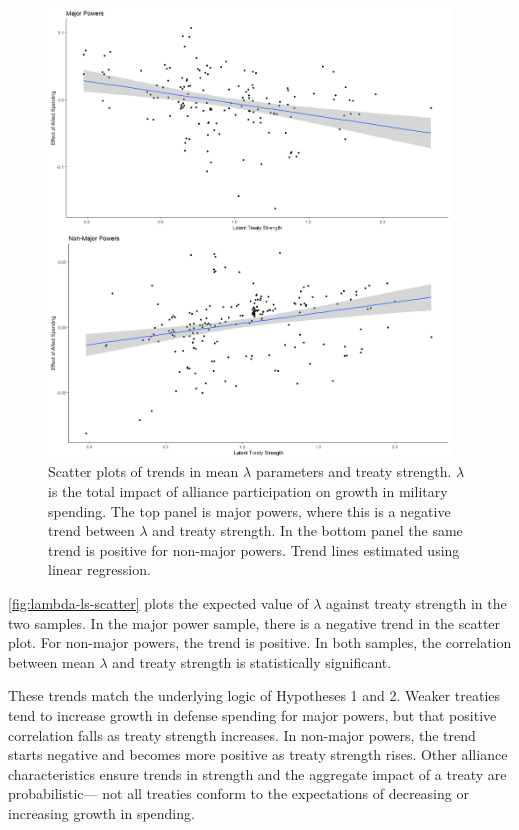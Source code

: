 \documentclass[12pt]{article}
\begin{document}
\begin{figure}[htbp]
	\centering
		\includegraphics[width=0.95\textwidth]{../figures/lambda-ls-scatter.png}
	\caption{Scatter plots of trends in mean $\lambda$ parameters and treaty strength. $\lambda$ is the total impact of alliance participation on growth in military spending. The top panel is major powers, where this is a negative trend between $\lambda$ and treaty strength. In the bottom panel the same trend is positive for non-major powers. Trend lines estimated using linear regression.}
	\label{fig:lambda-ls-scatter}
\end{figure}


\autoref{fig:lambda-ls-scatter} plots the expected value of $\lambda$ against treaty strength in the two samples. 
In the major power sample, there is a negative trend in the scatter plot.
For non-major powers, the trend is positive.
In both samples, the correlation between mean $\lambda$ and treaty strength is statistically significant. 


These trends match the underlying logic of Hypotheses 1 and 2. 
Weaker treaties tend to increase growth in defense spending for major powers, but that positive correlation falls as treaty strength increases. 
In non-major powers, the trend starts negative and becomes more positive as treaty strength rises. 
Other alliance characteristics ensure trends in strength and the aggregate impact of a treaty are probabilistic--- not all treaties conform to the expectations of decreasing or increasing growth in spending. 
\end{document}
